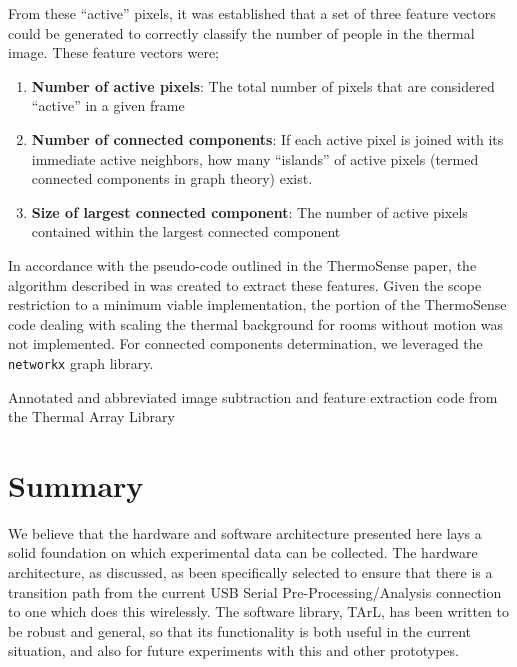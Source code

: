 \documentclass[../thesis/thesis.tex]{subfiles}
\begin{document}
From these ``active'' pixels, it was established that a set of three feature vectors could be generated to correctly classify the number of people in the thermal image. These feature vectors were;
\begin{enumerate}
\item \textbf{Number of active pixels}: The total number of pixels that are considered ``active'' in a given frame
\item \textbf{Number of connected components}: If each active pixel is joined with its immediate active neighbors, how many ``islands'' of active pixels (termed connected components in graph theory) exist.
\item \textbf{Size of largest connected component}: The number of active pixels contained within the largest connected component
\end{enumerate}

In accordance with the pseudo-code outlined in the ThermoSense paper, the algorithm described in  was created to extract these features. Given the scope restriction to a minimum viable implementation, the portion of the ThermoSense code dealing with scaling the thermal background for rooms without motion was not implemented. For connected components determination, we leveraged the \texttt{networkx} graph library.

\begin{listing}
\centering

\caption{Annotated and abbreviated image subtraction and feature extraction code from the Thermal Array Library}
\label{lst:exps:featcode}
\end{listing}


\section{Summary}
We believe that the hardware and software architecture presented here lays a solid foundation on which experimental data can be collected. The hardware architecture, as discussed, as been specifically selected to ensure that there is a transition path from the current USB Serial Pre-Processing/Analysis connection to one which does this wirelessly. The software library, TArL, has been written to be robust and general, so that its functionality is both useful in the current situation, and also for future experiments with this and other prototypes.
 
\end{document}
